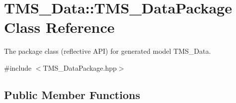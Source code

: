 \hypertarget{classTMS__Data_1_1TMS__DataPackage}{
\section{TMS\_\-Data::TMS\_\-DataPackage Class Reference}
\label{classTMS__Data_1_1TMS__DataPackage}
}


The package class (reflective API) for generated model TMS\_\-Data.  




{\ttfamily \#include $<$TMS\_\-DataPackage.hpp$>$}

\subsection*{Public Member Functions}
